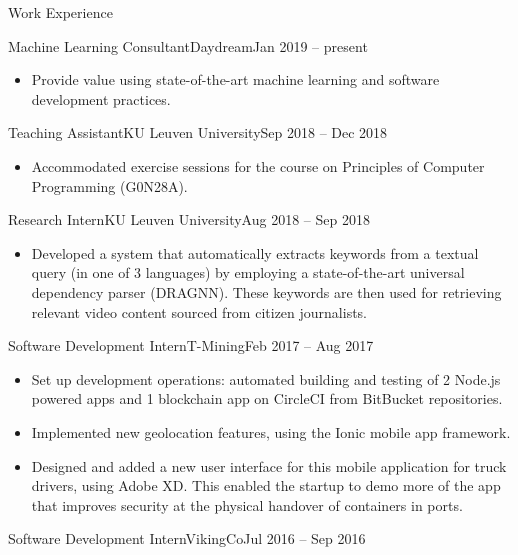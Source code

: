 \documentclass[]{mcdowellcv}
\begin{document}
\begin{cvsection}{Work Experience}
	\begin{cvsubsection}{Machine Learning Consultant}{Daydream}{Jan 2019 -- present}
		\begin{itemize}%
			\item Provide value using state-of-the-art machine learning and software development practices.
		\end{itemize}
	\end{cvsubsection}
	\begin{cvsubsection}{Teaching Assistant}{KU Leuven University}{Sep 2018 -- Dec 2018}
		\begin{itemize}%
			\item Accommodated exercise sessions for the course on Principles of Computer Programming (G0N28A).
		\end{itemize}
	\end{cvsubsection}
	\begin{cvsubsection}{Research Intern}{KU Leuven University}{Aug 2018 -- Sep 2018}
		\begin{itemize}%
			\item Developed a system that automatically extracts keywords from a textual query (in one of 3 languages) by employing a state-of-the-art universal dependency parser (DRAGNN). These keywords are then used for retrieving relevant video content sourced from citizen journalists.
		\end{itemize}
	\end{cvsubsection}
	\begin{cvsubsection}{Software Development Intern}{T-Mining}{Feb 2017 -- Aug 2017}
		\begin{itemize}%
			\item Set up development operations: automated building and testing of 2 Node.js powered apps and 1 blockchain app on CircleCI from BitBucket repositories.
			\item Implemented new geolocation features, using the Ionic mobile app framework. 
			\item Designed and added a new user interface for this mobile application for truck drivers, using Adobe XD. This enabled the startup to demo more of the app that improves security at the physical handover of containers in ports.
		\end{itemize}
	\end{cvsubsection}
	\begin{cvsubsection}{Software Development Intern}{VikingCo}{Jul 2016 -- Sep 2016}
		\begin{itemize}%

\end{itemize}
\end{cvsubsection}
\end{cvsection}
\end{document}

